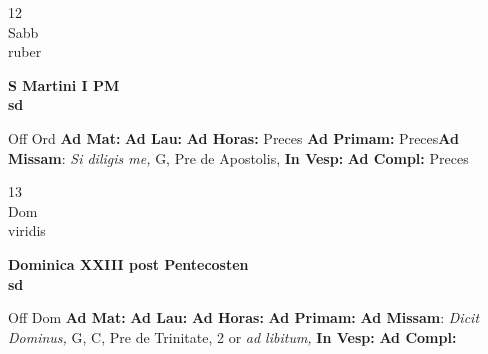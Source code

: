 \documentclass[10pt, openany]{book}
\begin{document}
    \begin{center}
        \begin{minipage}{3.5in}
            \vspace{2em}
            \begin{minipage}{0.5in}
                {\Huge 12} \\
                {\normalsize Sabb} \\
                {\normalsize ruber}
            \end{minipage}
            \begin{minipage}{3.0in}
                \textbf{ \large S Martini I PM \\
                \textnormal{\normalsize sd}} \\ 
            \end{minipage}
            \begin{justify}Off Ord
                \textbf{Ad Mat: }
                \textbf{Ad Lau: }
                \textbf{Ad Horas: }Preces
                \textbf{Ad Primam: }Preces\textbf{Ad Missam}: \textit{Si diligis me,} G, Pre de Apostolis,  
                \textbf{In Vesp: }
                \textbf{Ad Compl: }Preces
            \end{justify}
        \end{minipage}
    \end{center}

    \begin{center}
        \begin{minipage}{3.5in}
            \vspace{2em}
            \begin{minipage}{0.5in}
                {\Huge 13} \\
                {\normalsize Dom} \\
                {\normalsize viridis}
            \end{minipage}
            \begin{minipage}{3.0in}
                \textbf{ \large Dominica XXIII post Pentecosten \\
                \textnormal{\normalsize sd}} \\ 
            \end{minipage}
            \begin{justify}Off Dom
                \textbf{Ad Mat: }
                \textbf{Ad Lau: }
                \textbf{Ad Horas: }
                \textbf{Ad Primam: }\textbf{Ad Missam}: \textit{Dicit Dominus,} G, C, Pre de Trinitate, 2 or \textit{ad libitum,}  
                \textbf{In Vesp: }
                \textbf{Ad Compl: }
            \end{justify}
        \end{minipage}
    \end{center}
\end{document}
